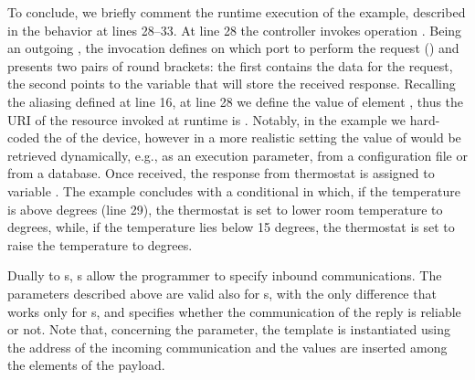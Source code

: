 To conclude, we briefly comment the runtime execution of the example, described
in the behavior at lines 28--33. At line 28 the controller invokes operation
. Being an outgoing , the
invocation defines on which port to perform the request ()
and presents two pairs of round brackets: the first contains the data for the
request, the second points to the variable that will store the received
response. Recalling the aliasing defined at line 16, at line 28 we define the
value of element , thus the URI of the resource invoked at
runtime is . Notably, in the
example we hard-coded the  of the device, however in a more realistic
setting the value of  would be retrieved dynamically, e.g., as an
execution parameter, from a configuration file or from a database. Once
received, the response from thermostat  is assigned to variable
. The example concludes with a conditional in which, if the
temperature is above  degrees (line 29), the thermostat is set to lower room
temperature to  degrees, while, if the temperature lies below \code
{15} degrees, the thermostat is set to raise the temperature to 
degrees.

Dually to s, s allow the programmer
to specify inbound communications. The parameters described above are valid also
for s, with the only difference that
 works only for s, and
specifies whether the communication of the reply is reliable or not.
%
Note that, concerning the  parameter, the template is instantiated
using the address of the incoming communication and the values are inserted
among the elements of the payload.
